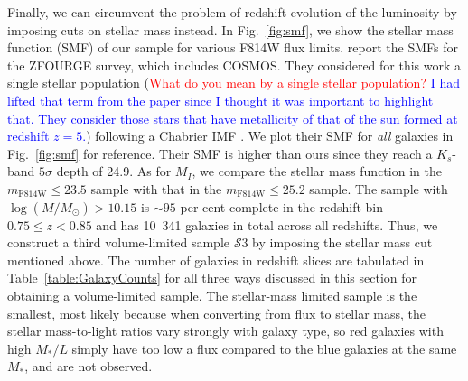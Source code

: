\documentclass[twocolumn,useAMS,usenatbib]{mn2e}
\newcommand{\rachel}[1]{{\textcolor{red}{#1}}}
\newcommand{\arun}[1]{{\textcolor{blue}{#1}}}
\newcommand{\s}{\ensuremath{\mathcal{S}}}
\begin{document}


Finally, we can circumvent the problem of redshift evolution of the
luminosity by imposing cuts on stellar mass instead. In Fig.~\ref{fig:smf}, we show the stellar mass function (SMF) of our sample for various F814W flux limits.
\cite{Tomczak_SMF} report the SMFs for the ZFOURGE survey, which
includes COSMOS. They considered for this work a single stellar
population (\rachel{What do you mean by a single stellar population?} \arun{I had lifted that term from the paper since I thought it was important to highlight that. 
They consider those stars that have metallicity of that of the sun formed at redshift $z=5$.})
following a Chabrier IMF \citep{ChabrierIMF}. 
We plot their SMF for \emph{all} galaxies in Fig.~\ref{fig:smf} for
reference. Their SMF is higher than ours since they reach a $K_s$-band
$5\sigma$ depth of 24.9. 
As for $M_I$, we compare the stellar mass function in the $m_\text{F814W}\le23.5$ sample with that in the $m_\text{F814W}\le25.2$ sample. 
The sample with $\log(M/M_\odot) > 10.15$ is $\sim 95$ per cent
complete in the redshift bin $0.75 \le z< 0.85$ and has 10~341
galaxies in total across all redshifts.
Thus, we construct a third volume-limited sample \s$3$ by imposing the stellar mass cut mentioned above. The number of galaxies in redshift slices
are tabulated in Table~\ref{table:GalaxyCounts} for all three ways
discussed in this section for obtaining a volume-limited sample. The
stellar-mass limited sample is the smallest, most likely because when
converting from flux to stellar mass, the stellar mass-to-light ratios
vary strongly with galaxy type, so red galaxies with high $M_*/L$
simply have too low a flux compared to the blue galaxies at the same
$M_*$, and are not observed.
\end{document}
